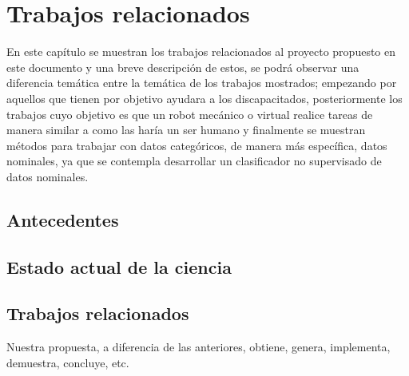 
\chapter{Trabajos relacionados}
\label{sec:chapter2}

En este cap\'itulo se muestran los trabajos relacionados al proyecto propuesto
 en este documento y una breve descripci\'on de estos, se podr\'a observar una
 diferencia tem\'atica entre la tem\'atica de los trabajos mostrados; empezando 
 por aquellos que tienen por objetivo ayudara a los discapacitados, 
 posteriormente los trabajos cuyo objetivo es que un robot mec\'anico o virtual 
 realice tareas de manera similar a como las har\'ia un ser humano y finalmente 
 se muestran m\'etodos para trabajar con datos categ\'oricos, de manera m\'as 
 espec\'ifica, datos nominales, ya que se contempla desarrollar un clasificador 
 no supervisado de datos nominales.
 

\section{Antecedentes}






\section{Estado actual de la ciencia}








\section{Trabajos relacionados}


 Nuestra propuesta, a diferencia de las anteriores, obtiene, genera, implementa, demuestra, concluye, etc.

